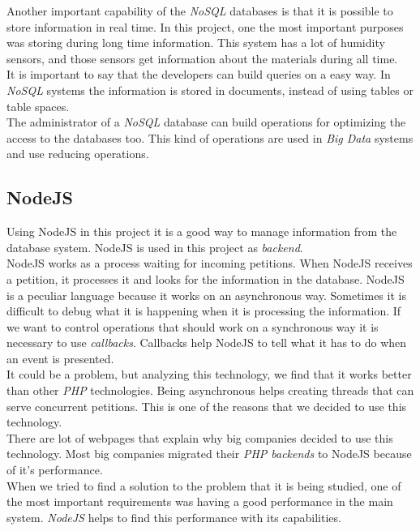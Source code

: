 Another important capability of the \textit{NoSQL} databases is that it is possible to store information in real time. In this project, one the most important purposes was storing during long time information. This system has a lot of humidity sensors, and those sensors get information about the materials during all time.\\

It is important to say that the developers can build queries on a easy way. In \textit{NoSQL} systems the information is stored in documents, instead of using tables or table spaces.\\

The administrator of a \textit{NoSQL} database can build operations for optimizing the access to the databases too. This kind of operations are used in \textit{Big Data} systems and use reducing operations.

\subsection{NodeJS}

Using NodeJS in this project it is a good way to manage information from the database system. NodeJS is used in this project as \textit{backend}.\\

NodeJS works as a process waiting for incoming petitions. When NodeJS receives a petition, it processes it and looks for the information in the database. NodeJS is a peculiar language because it works on an asynchronous way. Sometimes it is difficult to debug what it is happening when it is processing the information. If we want to control operations that should work on a synchronous way it is necessary to use \textit{callbacks}. Callbacks help NodeJS to tell what it has to do when an event is presented.\\

It could be a problem, but analyzing this technology, we find that it works better than other \textit{PHP} technologies. Being asynchronous helps creating threads that can serve concurrent petitions. This is one of the reasons that we decided to use this technology.\\

There are lot of webpages that explain why big companies decided to use this technology. Most big companies migrated their \textit{PHP backends} to NodeJS because of it's performance.\\

When we tried to find a solution to the problem that it is being studied, one of the most important requirements was having a good performance in the main system. \textit{NodeJS} helps to find this performance with its capabilities.

